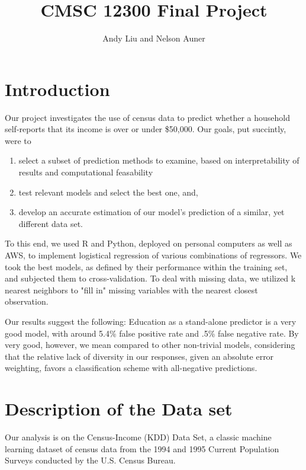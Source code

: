 \documentclass[11pt]{article}
\title{CMSC 12300 Final Project}
\author{Andy Liu and Nelson Auner}
\begin{document}
\maketitle
\section{Introduction}

Our project investigates the use of census data to  predict whether a household self-reports that its income is over or under \$50,000. Our goals, put succintly, were to

\begin{enumerate}
  \item select  a subset of prediction methods to examine, based on interpretability of results and computational feasability
  \item test relevant models and select the best one, and,
  \item develop an accurate estimation of our model's prediction of a similar, yet different data set.
\end{enumerate}
 

To this end, we used R and Python, deployed on personal computers as well as AWS, to implement logistical regression of various combinations of regressors. We took the best models, as defined by their performance within the training set, and subjected them to cross-validation. To deal with missing data, we utilized k nearest neighbors to "fill in" missing variables with the nearest closest observation.

 Our results suggest the following: Education as a stand-alone predictor is a very good model, with around 5.4\% false positive rate and .5\% false negative rate. By very good, however, we mean compared to other non-trivial models, considering that the relative lack of diversity in our responses, given an absolute error weighting, favors a classification scheme with all-negative predictions. 


\section{Description of the Data set}
Our analysis is on the Census-Income (KDD) Data Set, a classic machine learning dataset of census data from the 1994 and 1995 Current Population Surveys conducted by the U.S. Census Bureau.

\end{document}
